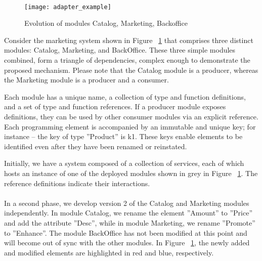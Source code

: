 \paragraph{}

\begin{figure}[htbp]
    \centering
    \texttt{[image: adapter\_example]}
    \caption{Evolution of modules Catalog, Marketing, Backoffice \cite{seco2020robust}}
    \label{fig:evolution_of_modules}
\end{figure}

Consider the marketing system shown in Figure ~\ref{fig:evolution_of_modules} that comprises three distinct modules: Catalog, Marketing, and BackOffice.
These three simple modules combined, form a triangle of dependencies, complex enough to demonstrate the proposed mechanism.
Please note that the Catalog module is a producer, whereas the Marketing module is a producer and a consumer.

Each module has a unique name, a collection of type and function definitions, and a set of type and function references.
If a producer module exposes definitions, they can be used by other consumer modules via an explicit reference.
Each programming element is accompanied by an immutable and unique key; for instance – the key of type ''Product'' is k1.
These keys enable elements to be identified even after they have been renamed or reinstated.

Initially, we have a system composed of a collection of services,
each of which hosts an instance of one of the deployed modules shown in grey in Figure ~\ref{fig:evolution_of_modules}.
The reference definitions indicate their interactions.

\paragraph{}

In a second phase, we develop version 2 of the Catalog and Marketing modules independently.
In module Catalog, we rename the element ''Amount'' to ''Price'' and add the attribute ''Desc'', while in module Marketing, we rename ''Promote'' to ''Enhance''.
The module BackOffice has not been modified at this point and will become out of sync with the other modules.
In Figure ~\ref{fig:evolution_of_modules}, the newly added and modified elements are highlighted in red and blue, respectively.

\paragraph{}

